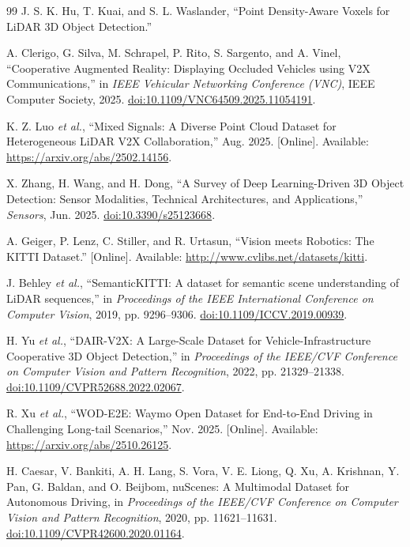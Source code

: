 \begin{thebibliography}{99}
\label{bib_ref_10} J. S. K. Hu, T. Kuai, and S. L. Waslander, ``Point Density-Aware Voxels for LiDAR 3D Object Detection.''

\label{bib_ref_11} A. Clerigo, G. Silva, M. Schrapel, P. Rito, S. Sargento, and A. Vinel, ``Cooperative Augmented Reality: Displaying Occluded Vehicles using V2X Communications,'' in \emph{IEEE Vehicular Networking Conference (VNC)}, IEEE Computer Society, 2025. \href{https://doi.org/10.1109/VNC64509.2025.11054191}{doi:10.1109/VNC64509.2025.11054191}.

\label{bib_ref_12} K. Z. Luo \emph{et al.}, ``Mixed Signals: A Diverse Point Cloud Dataset for Heterogeneous LiDAR V2X Collaboration,'' Aug. 2025. [Online]. Available: \url{https://arxiv.org/abs/2502.14156}.

\label{bib_ref_13} X. Zhang, H. Wang, and H. Dong, ``A Survey of Deep Learning-Driven 3D Object Detection: Sensor Modalities, Technical Architectures, and Applications,'' \emph{Sensors}, Jun. 2025. \href{https://doi.org/10.3390/s25123668}{doi:10.3390/s25123668}.

\label{bib_ref_14} A. Geiger, P. Lenz, C. Stiller, and R. Urtasun, ``Vision meets Robotics: The KITTI Dataset.'' [Online]. Available: \url{http://www.cvlibs.net/datasets/kitti}.

\label{bib_ref_15} J. Behley \emph{et al.}, ``SemanticKITTI: A dataset for semantic scene understanding of LiDAR sequences,'' in \emph{Proceedings of the IEEE International Conference on Computer Vision}, 2019, pp. 9296--9306. \href{https://doi.org/10.1109/ICCV.2019.00939}{doi:10.1109/ICCV.2019.00939}.

\label{bib_ref_16} H. Yu \emph{et al.}, ``DAIR-V2X: A Large-Scale Dataset for Vehicle-Infrastructure Cooperative 3D Object Detection,'' in \emph{Proceedings of the IEEE/CVF Conference on Computer Vision and Pattern Recognition}, 2022, pp. 21329--21338. \href{https://doi.org/10.1109/CVPR52688.2022.02067}{doi:10.1109/CVPR52688.2022.02067}.

\label{bib_ref_17} R. Xu \emph{et al.}, ``WOD-E2E: Waymo Open Dataset for End-to-End Driving in Challenging Long-tail Scenarios,'' Nov. 2025. [Online]. Available: \url{https://arxiv.org/abs/2510.26125}.

\label{bib_ref_18} H. Caesar, V. Bankiti, A. H. Lang, S. Vora, V. E. Liong, Q. Xu, A. Krishnan, Y. Pan, G. Baldan, and O. Beijbom, {nuScenes: A Multimodal Dataset for Autonomous Driving}, in \emph{Proceedings of the IEEE/CVF Conference on Computer Vision and Pattern Recognition}, 2020, pp. 11621--11631. \href{https://doi.org/10.1109/CVPR42600.2020.01164}{doi:10.1109/CVPR42600.2020.01164}.


\end{thebibliography}
